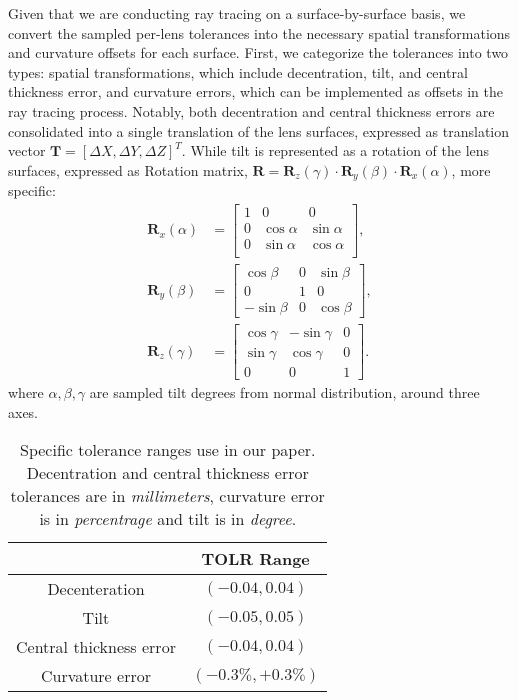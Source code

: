 Given that we are conducting ray tracing on a surface-by-surface basis, we convert the sampled per-lens tolerances into the necessary spatial transformations and curvature offsets for each surface. First, we categorize the tolerances into two types: spatial transformations, which include decentration, tilt, and central thickness error, and curvature errors, which can be implemented as offsets in the ray tracing process. Notably, both decentration and central thickness errors are consolidated into a single translation of the lens surfaces, expressed as translation vector $\boldsymbol{T} = [\Delta X, \Delta Y, \Delta Z]^T$.  While tilt is represented as a rotation of the lens surfaces, expressed as Rotation matrix, $\boldsymbol{R} = \boldsymbol{R}_z(\gamma)\cdot \boldsymbol{R}_y(\beta)\cdot \boldsymbol{R}_x(\alpha)$, more specific:
\begin{align}
\boldsymbol{R}_x(\alpha) &= \begin{bmatrix}
1 & 0 & 0 \\
0 & \cos{\alpha} & \sin{\alpha} \\
0 & \sin{\alpha} & \cos{\alpha} \\
\end{bmatrix}, \\
\boldsymbol{R}_y(\beta) &= \begin{bmatrix}
\cos{\beta} & 0 & \sin{\beta} \\
0 & 1 & 0 \\
-\sin{\beta} & 0 & \cos{\beta}
\end{bmatrix}, \\
\boldsymbol{R}_z(\gamma) &= \begin{bmatrix}
\cos{\gamma} & -\sin{\gamma} & 0 \\
\sin{\gamma} & \cos{\gamma} & 0 \\
0 & 0 & 1
\end{bmatrix}.
\end{align}
where $\alpha, \beta, \gamma$ are sampled tilt degrees from normal distribution, around three axes.

\begin{table}
\centering
\caption{Specific tolerance ranges use in our paper. Decentration and central thickness error tolerances are in \emph{millimeters}, curvature error is in \emph{percentrage} and tilt is in \emph{degree}.}
\begin{tabular}{c|c}
\hline
& TOLR Range \\
\hline
Decenteration & $(-0.04, 0.04)$ \\
Tilt & $(-0.05, 0.05)$ \\
Central thickness error & $(-0.04, 0.04)$ \\
Curvature error & $(-0.3\%, +0.3\%)$ \\
\hline
\end{tabular}
\label{tab:tolr_range}
\end{table}

